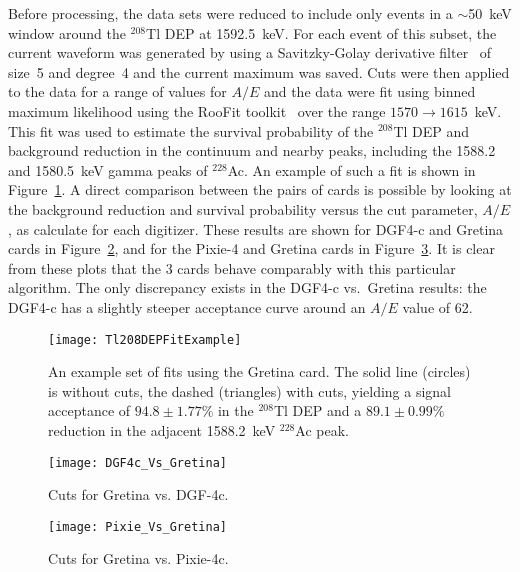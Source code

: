 	 Before processing, the data sets were reduced to include only events in a $\sim$50~keV window around the $^{208}$Tl DEP at 1592.5~keV.  For each event of this subset, the current waveform was generated by using a Savitzky-Golay derivative filter~\cite{Sav64aa} of size~5 and degree~4 and the current maximum was saved.  Cuts were then applied to the data for a range of values for $A/E$ and the data were fit using binned maximum likelihood using the RooFit toolkit~\cite{ver03aa} over the range $1570\to1615$~keV.  This fit was used to estimate the survival probability of the $^{208}$Tl DEP and background reduction in the continuum and nearby peaks, including the 1588.2 and 1580.5~keV gamma peaks of $^{228}$Ac.  An example of such a fit is shown in Figure~\ref{fig:HeadToHeadExampleFit}.  A direct comparison between the pairs of cards is possible by looking at the background reduction and survival probability versus the cut parameter, $A/E$, as calculate for each digitizer.  These results are shown for DGF4-c and Gretina cards in Figure~\ref{fig:HeadToHeadDGF4cResults}, and for the Pixie-4 and Gretina cards in Figure~\ref{fig:HeadToHeadPixie4cResults}.  It is clear from these plots that the 3 cards behave comparably with this particular algorithm.  The only discrepancy exists in the DGF4-c vs.~Gretina results: the DGF4-c has a slightly steeper acceptance curve around an $A/E$ value of 62.
	 
			\begin{figure}
				\centering
				\texttt{[image: Tl208DEPFitExample]}
				\caption[An example set of fits using the Gretina card]
				{An example set of fits using the Gretina card.  The solid line (circles) is without cuts, the dashed (triangles)
				 with cuts, yielding a signal acceptance of $94.8\pm1.77\%$ in the $^{208}$Tl DEP and a $89.1\pm0.99\%$ 
				 reduction in the adjacent 1588.2~keV $^{228}$Ac peak.}
				\label{fig:HeadToHeadExampleFit}
			\end{figure}	
		
			\begin{figure}
				\centering
				\texttt{[image: DGF4c\_Vs\_Gretina]}
				\caption[Cuts for Gretina vs. DGF-4c]
				{Cuts for Gretina vs. DGF-4c.}
				\label{fig:HeadToHeadDGF4cResults}
			\end{figure}	
	
			\begin{figure}
				\centering
				\texttt{[image: Pixie\_Vs\_Gretina]}
				\caption[Cuts for Gretina vs. Pixie-4c]{Cuts for Gretina vs. Pixie-4c.}
				\label{fig:HeadToHeadPixie4cResults}
			\end{figure}	
			
